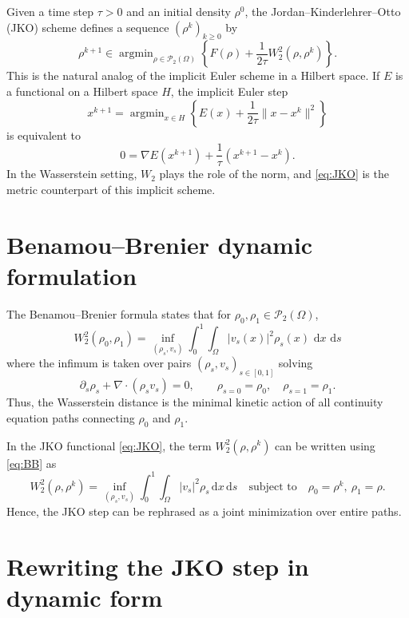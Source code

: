 \documentclass[11pt]{article}
\numberwithin{equation}{section}
\theoremstyle{definition}
\newcommand{\Ptwo}{\mathcal{P}_2}
\newcommand{\dd}{\,\mathrm{d}}
\begin{document}
Given a time step $\tau > 0$ and an initial density $\rho^0$, the Jordan--Kinderlehrer--Otto (JKO) scheme defines a sequence $(\rho^k)_{k \ge 0}$ by
\begin{equation}
\label{eq:JKO}
\rho^{k+1}
\in \operatorname{argmin}_{\rho \in \Ptwo(\Omega)}
\left\{
F(\rho) + \frac{1}{2\tau} W_2^2(\rho,\rho^k)
\right\}.
\end{equation}
This is the natural analog of the implicit Euler scheme in a Hilbert space. If $E$ is a functional on a Hilbert space $H$, the implicit Euler step
\[
x^{k+1} = \operatorname{argmin}_{x \in H} 
\left\{
E(x) + \frac{1}{2\tau}\|x - x^k\|^2
\right\}
\]
is equivalent to
\[
0 = \nabla E(x^{k+1}) + \frac{1}{\tau}(x^{k+1} - x^k).
\]
In the Wasserstein setting, $W_2$ plays the role of the norm, and \eqref{eq:JKO} is the metric counterpart of this implicit scheme.


\section{Benamou--Brenier dynamic formulation}

The Benamou--Brenier formula states that for $\rho_0,\rho_1\in \Ptwo(\Omega)$,
\begin{equation}
\label{eq:BB}
W_2^2(\rho_0,\rho_1)
= \inf_{(\rho_s,v_s)} \int_0^1 \int_{\Omega} |v_s(x)|^2 \rho_s(x)\,\dd x\,\dd s
\end{equation}
where the infimum is taken over pairs $(\rho_s,v_s)_{s\in[0,1]}$ solving
\begin{equation}
\label{eq:BB-CE}
\partial_s \rho_s + \nabla\cdot(\rho_s v_s) = 0,
\qquad
\rho_{s=0} = \rho_0,\quad \rho_{s=1} = \rho_1.
\end{equation}
Thus, the Wasserstein distance is the minimal kinetic action of all continuity equation paths connecting $\rho_0$ and $\rho_1$.

In the JKO functional \eqref{eq:JKO}, the term $W_2^2(\rho,\rho^k)$ can be written using \eqref{eq:BB} as
\[
W_2^2(\rho,\rho^k)
= \inf_{(\rho_s,v_s)} \int_0^1\!\!\int_{\Omega} |v_s|^2 \rho_s\dd x\dd s
\quad\text{subject to}\quad
\rho_0 = \rho^k,\ \rho_1 = \rho.
\]
Hence, the JKO step can be rephrased as a joint minimization over entire paths.

\section{Rewriting the JKO step in dynamic form}
\end{document}
